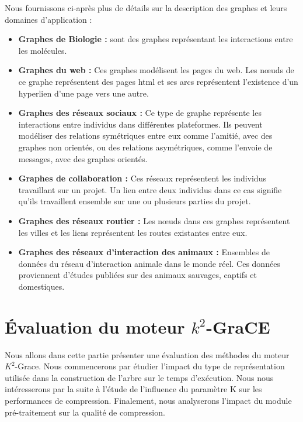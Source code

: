 	
	Nous fournissons ci-après plus de détails sur la description des graphes et leurs domaines d'application :
	\begin{itemize}
	
	
	\item \textbf{Graphes de Biologie :} sont des graphes représentant les interactions entre les molécules.
	
	\item \textbf{Graphes du web :} Ces graphes  modélisent les pages du web. Les nœuds de ce graphe représentent des pages html et ses arcs représentent l'existence d'un hyperlien d'une page vers une autre.  

	\item \textbf{Graphes des réseaux sociaux :} Ce type de graphe représente les interactions entre individus dans différentes plateformes. Ils peuvent modéliser des relations symétriques entre eux comme l'amitié, avec des graphes non orientés, ou des relations asymétriques, comme l'envoie de messages, avec des graphes orientés.

	\item \textbf{Graphes de collaboration :} Ces réseaux représentent les individus travaillant sur un projet. Un lien entre deux individus dans ce cas signifie qu'ils travaillent ensemble sur une ou plusieurs parties du projet. 

	\item \textbf{Graphes des réseaux routier :}  Les nœuds dans ces graphes représentent les villes et les liens représentent les routes existantes entre eux.
	
	\item \textbf{Graphes des réseaux d'interaction des animaux :} Ensembles de données du réseau d'interaction animale dans le monde réel. Ces données proviennent d'études publiées sur des animaux sauvages, captifs et domestiques.
	
	
	\end{itemize}
	
	\section{Évaluation du moteur $k^2$-GraCE}
	Nous allons dans cette partie présenter une évaluation des méthodes du moteur $K^2$-Grace. 
	Nous commencerons par étudier l'impact du type de représentation utilisée dans la construction de l'arbre sur le temps d'exécution. Nous nous intéresserons par la suite à l'étude de l'influence du paramètre K sur les performances de compression.
	Finalement, nous  analyserons  l'impact  du module pré-traitement sur la qualité de compression. 
